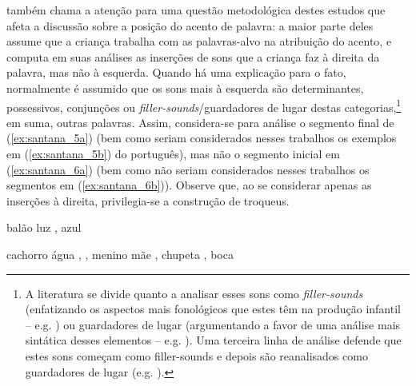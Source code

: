 \documentclass[output=paper]{LSP/langsci}
\begin{document}
\citet{santos2001} também chama a atenção para uma questão metodológica destes estudos que afeta a discussão sobre a posição do acento de palavra: a maior parte deles assume que a criança trabalha com as palavras-alvo na atribuição do acento, e computa em suas análises as inserções de sons que a criança faz à direita da palavra, mas não à esquerda. Quando há uma explicação para o fato, normalmente é assumido que os sons mais à esquerda são determinantes, possessivos, conjunções ou \textit{filler-sounds}/guardadores de lugar destas categorias,\footnote{A literatura se divide quanto a analisar esses sons como \textit{filler-sounds} (enfatizando os aspectos mais fonológicos que estes têm na produção infantil – e.g. \citealt{pizzutocaselli1992}) ou guardadores de lugar (argumentando a favor de uma análise mais sintática desses elementos – e.g. \citealt{petersmenn1993}). Uma terceira linha de análise defende que estes sons começam como filler-sounds e depois são reanalisados como guardadores de lugar (e.g. \citealt{santos1995,venezianosinclair}).} em suma, outras palavras. Assim, considera-se para análise o segmento final de (\ref{ex:santana_5a}) (bem como seriam considerados nesses trabalhos os exemplos em (\ref{ex:santana_5b}) do português), mas não o segmento inicial em (\ref{ex:santana_6a}) (bem como não seriam considerados nesses trabalhos os segmentos em (\ref{ex:santana_6b})). Observe que, ao se considerar apenas as inserções à direita, privilegia-se a construção de troqueus.

\ea\label{ex:santana_5}
\ea\label{ex:santana_5a}
balão  
\ex\label{ex:santana_5b}
luz \ipa{[\pstr lu.zi]}, azul \ipa{[a.\pstr zu.li]}
\zl

\ea\label{ex:santana_6}
\ea\label{ex:santana_6a}
cachorro  \ipa{[e\pstr S\~{E}]}
\ex\label{ex:santana_6b}
água \ipa{[a\pstr a]},  \textipa{[ti.\pstr pa]}, menino \ipa{[a.\pstr mi]}
mãe \ipa{[1\pstr m5]}, chupeta \ipa{[5.\pstr pi]}, boca \\
\zl
\end{document}
